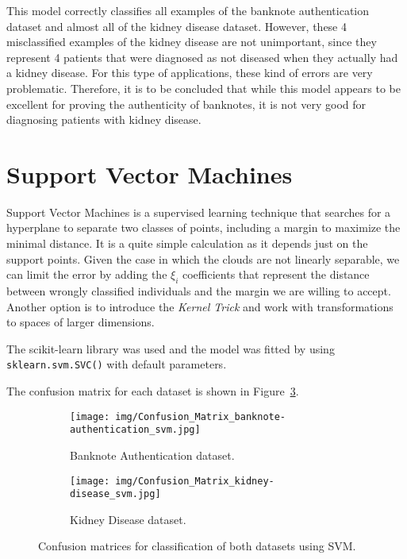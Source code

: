\documentclass[11pt,a4paper]{article}
\begin{document}
This model correctly classifies all examples of the banknote authentication dataset and almost all of the kidney disease dataset. However, these 4 misclassified examples of the kidney disease are not unimportant, since they represent 4 patients that were diagnosed as not diseased when they actually had a kidney disease. For this type of applications, these kind of errors are very problematic. Therefore, it is to be concluded that while this model appears to be excellent for proving the authenticity of banknotes, it is not very good for diagnosing patients with kidney disease. 

\section{Support Vector Machines}

Support Vector Machines is a supervised learning technique that searches for a hyperplane to separate two classes of points, including a margin to maximize the minimal distance. It is a quite simple calculation as it depends just on the support points. Given the case in which the clouds are not linearly separable, we can limit the error by adding the $\xi_i$ coefficients that represent the distance between wrongly classified individuals and the margin we are willing to accept. Another option is to introduce the \textit{Kernel Trick} and work with transformations to spaces of larger dimensions. 

The scikit-learn library was used and the model was fitted by using \texttt{sklearn.svm.SVC()} with default parameters.

The confusion matrix for each dataset is shown in Figure~\ref{cm_svm}.

\begin{figure}[H]
\centering
\begin{subfigure}{.5\textwidth}
  \centering
  \texttt{[image: img/Confusion\_Matrix\_banknote-authentication\_svm.jpg]}
  \caption{Banknote Authentication dataset.}
  \label{fig:sub1}
\end{subfigure}%
\begin{subfigure}{.5\textwidth}
  \centering
  \texttt{[image: img/Confusion\_Matrix\_kidney-disease\_svm.jpg]}
  \caption{Kidney Disease dataset.}
  \label{fig:sub2}
\end{subfigure}
\caption{Confusion matrices for classification of both datasets using SVM.}
\label{cm_svm}
\end{figure}
\end{document}
